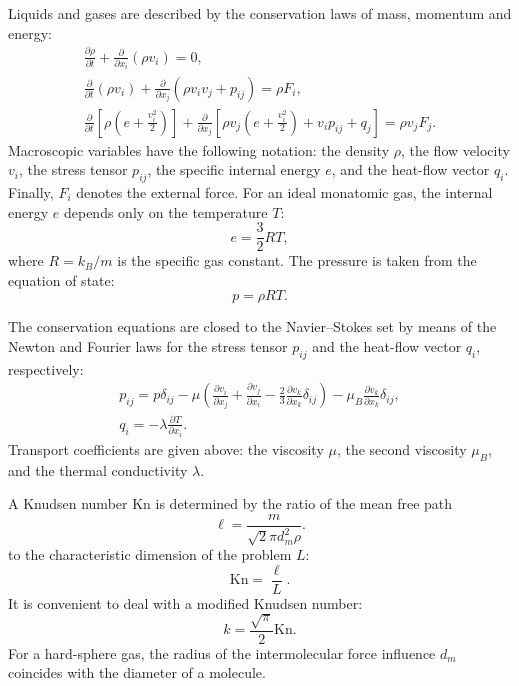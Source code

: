 \documentclass[english,a4paper,10pt]{article}
\newcommand{\Kn}{\mathrm{Kn}}
\newcommand{\pder}[2][]{\frac{\partial#1}{\partial#2}}
\begin{document}
Liquids and gases are described by the conservation laws of mass, momentum and energy:
\begin{gather}
	\pder[\rho]{t} + \pder{x_i}(\rho v_i) = 0, \label{eq:mass}\\
	\pder{t}(\rho v_i) + \pder{x_j}(\rho v_i v_j + p_{ij}) = \rho F_i, \label{eq:momentum}\\
	\pder{t}\left[\rho\left(e+\frac{v_i^2}2\right)\right] +
		\pder{x_j}\left[\rho v_j\left(e+\frac{v_i^2}2\right)+v_i p_{ij}+q_j\right] = \rho v_j F_j. \label{eq:energy}
\end{gather}
Macroscopic variables have the following notation: the density \(\rho\), the flow velocity \(v_i\), the stress tensor \(p_{ij}\),
the specific internal energy \(e\), and the heat-flow vector \(q_i\). Finally, \(F_i\) denotes the external force.
For an ideal monatomic gas, the internal energy \(e\) depends only on the temperature \(T\):
\[ e = \frac32RT, \]
where \(R = k_B / m\) is the specific gas constant. The pressure is taken from the equation of state:
\[ p = \rho RT. \]

The conservation equations are closed to the Navier--Stokes set by means of the Newton and Fourier laws
for the stress tensor \(p_{ij}\) and the heat-flow vector \(q_i\), respectively:
\begin{gather}
	p_{ij} = p\delta_{ij} - \mu\left(\pder[v_i]{x_j}+\pder[v_j]{x_i}-\frac23\pder[v_k]{x_k}\delta_{ij}\right) -
		\mu_B\pder[v_k]{x_k}\delta_{ij}, \label{eq:stress_tensor}\\
	q_i = -\lambda\pder[T]{x_i}. \label{eq:heat_flow}
\end{gather}
Transport coefficients are given above:
the viscosity \(\mu\), the second viscosity \(\mu_B\), and the thermal conductivity \(\lambda\).

A Knudsen number \(\Kn\) is determined by the ratio of the mean free path
\begin{equation}\label{eq:ell}
	\ell = \frac{m}{\sqrt2\pi d_m^2 \rho}.
\end{equation}
to the characteristic dimension of the problem \(L\):
\begin{equation}\label{eq:Knudsen}
	\Kn = \frac{\ell}L.
\end{equation}
It is convenient to deal with a modified Knudsen number:
\begin{equation}
	k = \frac{\sqrt\pi}2\Kn.
\end{equation}
For a hard-sphere gas, the radius of the intermolecular force influence \(d_m\)
coincides with the diameter of a molecule.
\end{document}
